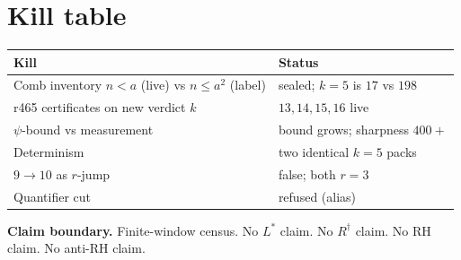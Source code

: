 \documentclass[11pt]{article}
\begin{document}
\section{Kill table}\label{sec:kills}

\begin{center}
\begin{tabular}{@{}lp{7.8cm}@{}}
\toprule
Kill & Status \\
\midrule
Comb inventory $n<a$ (live) vs $n\le a^2$ (label)
  & sealed; $k=5$ is $17$ vs $198$ \\
r465 certificates on new verdict $k$
  & $13,14,15,16$ live \\
$\psi$-bound vs measurement
  & bound grows; sharpness $400+$ \\
Determinism
  & two identical $k=5$ packs \\
$9\to10$ as $r$-jump
  & false; both $r=3$ \\
Quantifier cut
  & refused (alias) \\
\bottomrule
\end{tabular}
\end{center}

\medskip\noindent
\textbf{Claim boundary.}\enspace
Finite-window census.
No $L^{*}$ claim.
No $R^{\dagger}$ claim.
No RH claim.
No anti-RH claim.
\end{document}
